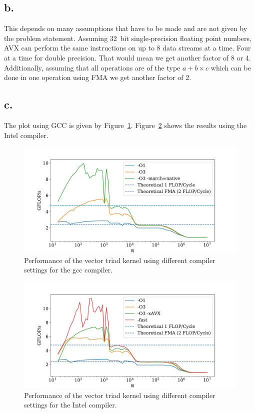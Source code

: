 \documentclass[a4paper, 11pt]{article}
\begin{document}
\subsection*{b.}
This depends on many assumptions that have to be made and are not given by
the problem statement. Assuming \SI{32}{bit} single-precision floating point
numbers, AVX can perform the same instructions on up to 8 data streams at a
time. Four at a time for double precision. That would mean we get another
factor of 8 or 4. Additionally, assuming that all operations are of the type
$a+b\times c$ which can be done in one operation using FMA we get another
factor of 2.

\subsection*{c.}
The plot using GCC is given by Figure~\ref{fig:1_gcc}. Figure~\ref{fig:1_icc}
shows the results using the Intel compiler.
\begin{figure}
  \centering
  \includegraphics[width=\textwidth]{../plot/1/1b_gcc.pdf}
  \caption{Performance of the vector triad kernel using different compiler
  settings for the gcc compiler.}
  \label{fig:1_gcc}
\end{figure}
\begin{figure}
  \centering
  \includegraphics[width=\textwidth]{../plot/1/1b_icc.pdf}
  \caption{Performance of the vector triad kernel using different compiler
  settings for the Intel compiler.}
  \label{fig:1_icc}
\end{figure}
\end{document}
